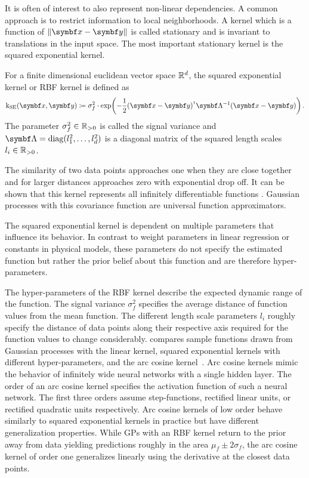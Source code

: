 It is often of interest to also represent non-linear dependencies.
A common approach is to restrict information to local neighborhoods.
A kernel which is a function of $\norm{\mat{x} - \mat{y}}$ is called stationary and is invariant to translations in the input space.
The most important stationary kernel is the squared exponential kernel.
\begin{definition}
    \label{def:gp:rbf_kernel}
    For a finite dimensional euclidean vector space $\mathbb{R}^d$, the squared exponential kernel or RBF kernel is defined as
    \begin{equation}
        \K_{\text{SE}}(\mat{x}, \mat{y}) \coloneqq \sigma_f^2 \cdot \exp\!\left( -\frac{1}{2} (\mat{x} - \mat{y})\tran \mat{\Lambda}^{-1} (\mat{x} - \mat{y}) \right).
    \end{equation}
    The parameter $\sigma_f^2 \in \mathbb{R}_{>0}$ is called the signal variance and $\mat{\Lambda} = \diag(l_1^2, \dots, l_d^2)$ is a diagonal matrix of the squared length scales $l_i \in \mathbb{R}_{>0}$.
\end{definition}
The similarity of two data points approaches one when they are close together and for larger distances approaches zero with exponential drop off.
It can be shown that this kernel represents all infinitely differentiable functions \cite{rasmussen_gaussian_2006}.
Gaussian processes with this covariance function are universal function approximators.

The squared exponential kernel is dependent on multiple parameters that influence its behavior.
In contrast to weight parameters in linear regression or constants in physical models, these parameters do not specify the estimated function but rather the prior belief about this function and are therefore hyper-parameters.

The hyper-parameters of the RBF kernel describe the expected dynamic range of the function.
The signal variance $\sigma_f^2$ specifies the average distance of function values from the mean function.
The different length scale parameters $l_i$ roughly specify the distance of data points along their respective axis required for the function values to change considerably.
 compares sample functions drawn from Gaussian processes with the linear kernel, squared exponential kernels with different hyper-parameters, and the arc cosine kernel~\parencite{cho_kernel_2009}.
Arc cosine kernels mimic the behavior of infinitely wide neural networks with a single hidden layer.
The order of an arc cosine kernel specifies the activation function of such a neural network.
The first three orders assume step-functions, rectified linear units, or rectified quadratic units respectively.
Arc cosine kernels of low order behave similarly to squared exponential kernels in practice but have different generalization properties.
While GPs with an RBF kernel return to the prior away from data yielding predictions roughly in the area $\mu_f \pm 2\sigma_f$, the arc cosine kernel of order one generalizes linearly using the derivative at the closest data points.

